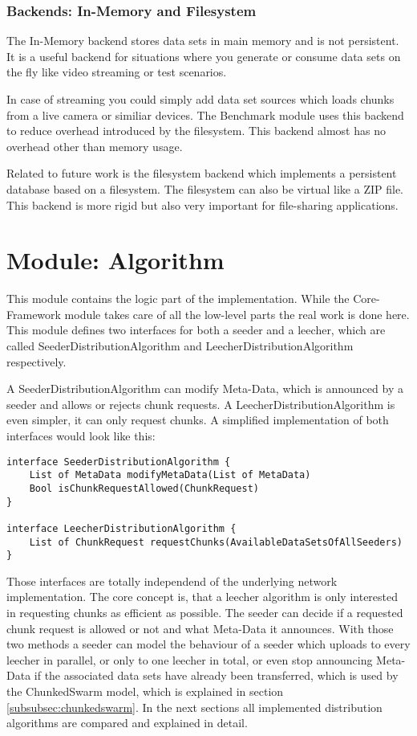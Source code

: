 \subsubsection{Backends: In-Memory and Filesystem}
The In-Memory backend stores data sets in main memory and is not persistent. It is a useful backend for situations where you generate or consume data sets on the fly like video streaming or test scenarios.

In case of streaming you could simply add data set sources which loads chunks from a live camera or similiar devices. The Benchmark module uses this backend to reduce overhead introduced by the filesystem. This backend almost has no overhead other than memory usage.

Related to future work is the filesystem backend which implements a persistent database based on a filesystem. The filesystem can also be virtual like a ZIP file. This backend is more rigid but also very important for file-sharing applications.

\cleardoublepage
\section{Module: Algorithm}
\label{sec:algorithm}
This module contains the logic part of the implementation. While the Core-Framework module takes care of all the low-level parts the real work is done here. This module defines two interfaces for both a seeder and a leecher, which are called SeederDistributionAlgorithm and LeecherDistributionAlgorithm respectively. 

A SeederDistributionAlgorithm can modify Meta-Data, which is announced by a seeder and allows or rejects chunk requests. A LeecherDistributionAlgorithm is even simpler, it can only request chunks. A simplified implementation of both interfaces would look like this:

\begin{verbatim}
interface SeederDistributionAlgorithm {
    List of MetaData modifyMetaData(List of MetaData)
    Bool isChunkRequestAllowed(ChunkRequest)
}

interface LeecherDistributionAlgorithm {
    List of ChunkRequest requestChunks(AvailableDataSetsOfAllSeeders)
}
\end{verbatim}

Those interfaces are totally independend of the underlying network implementation. The core concept is, that a leecher algorithm is only interested in requesting chunks as efficient as possible. The seeder can decide if a requested chunk request is allowed or not and what Meta-Data it announces. With those two methods a seeder can model the behaviour of a seeder which uploads to every leecher in parallel, or only to one leecher in total, or even stop announcing Meta-Data if the associated data sets have already been transferred, which is used by the ChunkedSwarm model, which is explained in section \ref{subsubsec:chunkedswarm}. In the next sections all implemented distribution algorithms are compared and explained in detail.

